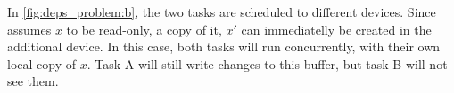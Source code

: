 \documentclass[main.tex]{subfiles}
\begin{document}
In \cref{fig:deps_problem:b}, the two tasks are scheduled to different devices. Since \starpu assumes $x$ to be read-only, a copy of it, $x'$ can immediatelly be created in the additional device. In this case, both tasks will run concurrently, with their own local copy of $x$. Task A will still write changes to this buffer, but task B will not see them.
\end{document}
